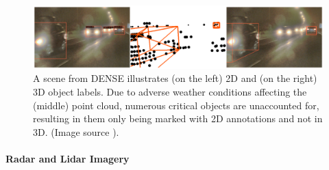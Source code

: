 \documentclass[report.tex]{subfiles}
\begin{document}
    \begin{figure}[h]
        \centering
        \includegraphics[width=1.0\textwidth]{images/methods/hrfuser/2d vs 3d annotations.png}
        \caption{A scene from DENSE \cite{bijelic2020seeing} illustrates (on the left) 2D and (on the right) 3D object labels. Due to adverse weather conditions affecting the (middle) point cloud, numerous critical objects are unaccounted for, resulting in them only being marked with 2D annotations and not in 3D. (Image source \cite{broedermann2022hrfuser}).}
        \label{fig:hrfuser_2d_vs_3d_annotations}
    \end{figure}

    \paragraph*{Radar and Lidar Imagery}

\end{document}
